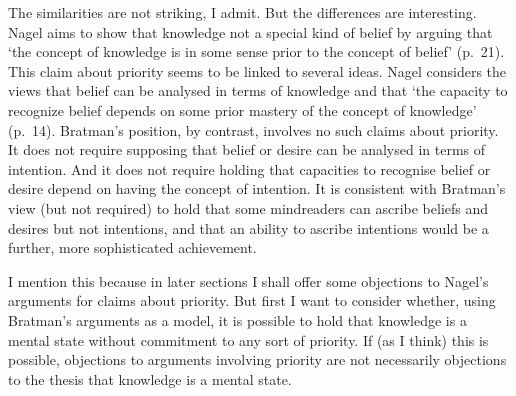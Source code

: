 \documentclass[11pt,a4paper]{extarticle}
\begin{document}
The similarities are not striking, I admit.
But the differences are interesting.
Nagel aims to show that knowledge not a special kind of belief by arguing that `the concept of knowledge is in some sense prior to the concept of belief' (p.\ 21).
This claim about priority seems to be linked to several ideas.
Nagel considers the views that belief can be analysed in terms of knowledge and that `the capacity to recognize belief depends on some prior mastery of the concept of knowledge' (p.\ 14).
Bratman's position, 
by contrast, 
involves no such claims about priority.
It does not require supposing that belief or desire can be analysed in terms of intention.
And it does not require holding that capacities to recognise belief or desire depend on having the concept of intention.
It is consistent with Bratman's view 
(but not required) 
to hold that 
some mindreaders can ascribe beliefs and desires but not intentions,
and that 
an ability to ascribe intentions would be a further, more sophisticated achievement.

I mention this because in later sections I shall offer some objections to Nagel's arguments for claims about priority.
But first I want to
consider whether, using Bratman's arguments as a model,
it is possible to  hold that
 knowledge is a mental state 
without
commitment to any sort of priority.
If (as I think) this is possible, 
objections to arguments involving priority 
are not necessarily
objections to the thesis that knowledge is a mental state.

\end{document}
